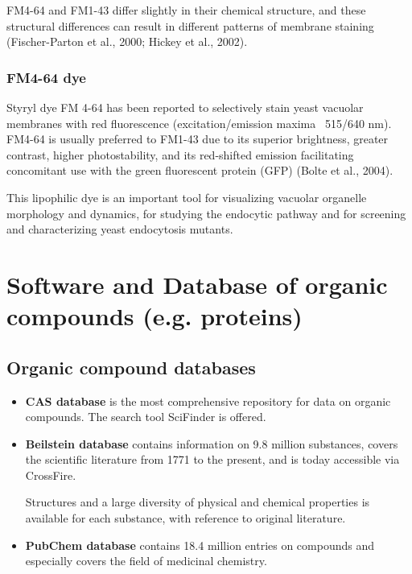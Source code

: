 FM4-64 and FM1-43 differ slightly in their chemical structure, and these
structural differences can result in different patterns of membrane staining
(Fischer-Parton et al., 2000; Hickey et al., 2002).  


\subsection{FM4-64 dye}
\label{sec:FM4-64-dye}

Styryl dye FM 4-64 has been reported to selectively stain yeast vacuolar
membranes with red fluorescence (excitation/emission maxima ~515/640 nm). 
FM4-64 is usually preferred to FM1-43 due to its superior brightness, greater
contrast, higher photostability, and its red-shifted emission facilitating
concomitant use with the green fluorescent protein (GFP) (Bolte et al., 2004).

This lipophilic dye is an important tool for visualizing vacuolar organelle
morphology and dynamics, for studying the endocytic pathway and for screening
and characterizing yeast endocytosis mutants. 

\chapter{Software and Database of organic compounds (e.g. proteins)}



\section{Organic compound databases}
\label{sec:databases}


\begin{itemize}
\item	{\bf CAS database} is the most comprehensive repository for data
  on organic compounds. The search tool SciFinder is offered.

\item {\bf Beilstein database} contains information on 9.8 million
  substances, covers the scientific literature from 1771 to the
  present, and is today accessible via CrossFire. 
  
  Structures and a large diversity of physical and chemical properties is
  available for each substance, with reference to original literature.

\item {\bf PubChem database} contains 18.4 million entries on compounds and
especially covers the field of medicinal chemistry.
\end{itemize}


